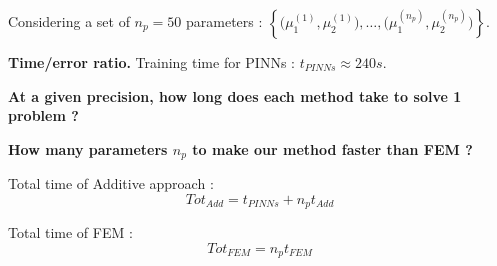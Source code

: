 \begin{columns}
{\begin{center}
\begin{tcolorbox}
                Considering a set of $n_p=50$ parameters : $\left\{\big(\mu_1^{(1)},\mu_2^{(1)}\big),\dots,\big(\mu_1^{(n_p)},\mu_2^{(n_p)}\big)\right\}$.
	
                \vspace{5pt}
                
                \hspace{20pt}\begin{minipage}{0.05\linewidth}
                    \normalsize
                    \flushright
                \end{minipage}
                \begin{minipage}{0.8\linewidth}
                    \centering
                \end{minipage} 
            \end{tcolorbox}

            \begin{tcolorbox}[
                colback=color1!50, %
                colframe=color2, %
                arc=2mm, %
                boxrule=2pt, %
                breakable, enhanced jigsaw,
                width=\linewidth
                ]            
                \textbf{Time/error ratio.} Training time for PINNs : $t_{PINNs}\approx 240s$.

                \vspace{10pt}

                 \textbf{At a given precision, how long does each method take to solve 1 problem ?}

                \begin{center}
                \end{center}

                \vspace{10pt}

                 \textbf{How many parameters $n_p$ to make our method faster than FEM ?}

                \vspace{10pt}

                \begin{minipage}{0.48\linewidth}
                    Total time of Additive approach :
                    \vspace{-5pt}
                    $$Tot_{Add}=t_{PINNs}+n_p t_{Add}$$
                \end{minipage}
                \begin{minipage}{0.48\linewidth}
                    Total time of FEM :
                    \vspace{-5pt}
                    $$Tot_{FEM}=n_p t_{FEM}$$
                \end{minipage}


\end{tcolorbox}
\end{center}}
\end{columns}
